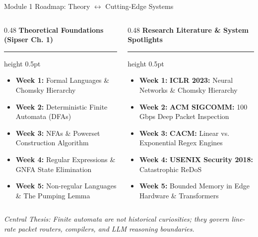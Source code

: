 \documentclass[aspectratio=169, 10pt]{beamer}
\newcommand{\colheader}[1]{%
  {\noindent\footnotesize\bfseries\color{gimpanavy}#1}%
  \vspace{0.03cm}%
  {\color{gimpanavy!30}\hrule height 0.5pt}%
  \vspace{0.08cm}%
}
\begin{document}
\begin{frame}{Module 1 Roadmap: Theory $\leftrightarrow$ Cutting-Edge Systems}
  \begin{columns}[T]
    \begin{column}{0.48\textwidth}
      \colheader{Theoretical Foundations (Sipser Ch. 1)}
      \begin{tcolorbox}[conceptcard]
        \begin{itemize}\setlength{\itemsep}{3.5pt}\footnotesize
          \item \textbf{Week 1:} Formal Languages \& Chomsky Hierarchy
          \item \textbf{Week 2:} Deterministic Finite Automata (DFAs)
          \item \textbf{Week 3:} NFAs \& Powerset Construction Algorithm
          \item \textbf{Week 4:} Regular Expressions \& GNFA State Elimination
          \item \textbf{Week 5:} Non-regular Languages \& The Pumping Lemma
        \end{itemize}
      \end{tcolorbox}
    \end{column}

    \hfill

    \begin{column}{0.48\textwidth}
      \colheader{Research Literature \& System Spotlights}
      \begin{tcolorbox}[spotlightcard]
        \begin{itemize}\setlength{\itemsep}{3.5pt}\footnotesize
          \item \textbf{Week 1:} \textbf{ICLR 2023:} Neural Networks \& Chomsky Hierarchy
          \item \textbf{Week 2:} \textbf{ACM SIGCOMM:} 100 Gbps Deep Packet Inspection
          \item \textbf{Week 3:} \textbf{CACM:} Linear vs. Exponential Regex Engines
          \item \textbf{Week 4:} \textbf{USENIX Security 2018:} Catastrophic ReDoS
          \item \textbf{Week 5:} Bounded Memory in Edge Hardware \& Transformers
        \end{itemize}
      \end{tcolorbox}
    \end{column}
  \end{columns}
  
  \vspace{0.20cm}
  \begin{center}
    {\footnotesize\color{gimpaslate}\textit{Central Thesis: Finite automata are not historical curiosities; they govern line-rate packet routers, compilers, and LLM reasoning boundaries.}}
  \end{center}
\end{frame}
\end{document}
